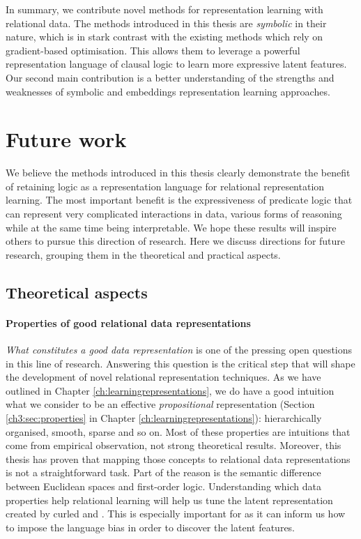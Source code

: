 In summary, we contribute novel methods for representation learning with relational data.
The methods introduced in this thesis are \textit{symbolic} in their nature, which is in stark contrast with the existing methods which rely on gradient-based optimisation.
This allows them to leverage a powerful representation language of clausal logic to learn more expressive latent features.
Our second main contribution is a better understanding of the strengths and weaknesses of symbolic and embeddings representation learning approaches.








\section{Future work}

We believe the methods introduced in this thesis clearly demonstrate the benefit of retaining logic as a representation language for relational representation learning.
The most important benefit is the expressiveness of predicate logic that can represent very complicated interactions in data, various forms of reasoning while at the same time being interpretable.
We hope these results will inspire others to pursue this direction of research.
Here we discuss directions for future research, grouping them in the theoretical and practical aspects.


\subsection{Theoretical aspects}


\paragraph{Properties of good relational data representations}
\textit{What constitutes a good data representation} is one of the pressing open  questions in this line of research.
Answering this question is the critical step that will shape the development of novel relational representation techniques.
As we have outlined in Chapter \ref{ch:learningrepresentations}, we do have a good intuition what we consider to be an effective \textit{propositional} representation (Section \ref{ch3:sec:properties} in Chapter \ref{ch:learningrepresentations}): hierarchically organised, smooth, sparse and so on.
Most of these properties are intuitions that come from empirical observation, not strong theoretical results.
Moreover, this thesis has proven that mapping those concepts to relational data representations is not a straightforward task.
Part of the reason is the semantic difference between Euclidean spaces and first-order logic.
Understanding which data properties help relational learning will help us tune the latent representation created by \gls{curled} and .
This is especially important for  as it can inform us how to impose the language bias in order to discover the latent features.





